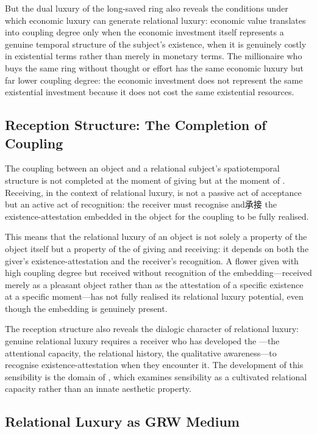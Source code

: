 But the dual luxury of the long-saved ring also reveals the conditions under which economic luxury can generate relational luxury: economic value translates into coupling degree only when the economic investment itself represents a genuine temporal structure of the subject's existence, when it is genuinely costly in existential terms rather than merely in monetary terms. The millionaire who buys the same ring without thought or effort has the same economic luxury but far lower coupling degree: the economic investment does not represent the same existential investment because it does not cost the same existential resources.

\subsection{Reception Structure: The Completion of Coupling}
\label{p16:subsec:reception}

\noindent
The coupling between an object and a relational subject's spatiotemporal structure is not completed at the moment of giving but at the moment of . Receiving, in the context of relational luxury, is not a passive act of acceptance but an active act of recognition: the receiver must recognise and承接 the existence-attestation embedded in the object for the coupling to be fully realised.

This means that the relational luxury of an object is not solely a property of the object itself but a property of the  of giving and receiving: it depends on both the giver's existence-attestation and the receiver's recognition. A flower given with high coupling degree but received without recognition of the embedding---received merely as a pleasant object rather than as the attestation of a specific existence at a specific moment---has not fully realised its relational luxury potential, even though the embedding is genuinely present.

The reception structure also reveals the dialogic character of relational luxury: genuine relational luxury requires a receiver who has developed the ---the attentional capacity, the relational history, the qualitative awareness---to recognise existence-attestation when they encounter it. The development of this sensibility is the domain of , which examines sensibility as a cultivated relational capacity rather than an innate aesthetic property.

\subsection{Relational Luxury as GRW Medium}
\label{p16:subsec:grw_medium}

